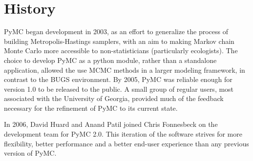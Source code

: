 \hypertarget{history}{}
\section*{History}

PyMC began development in 2003, as an effort to generalize the process of building Metropolis-Hastings samplers, with an aim to making Markov chain Monte Carlo more accessible to non-statisticians (particularly ecologists). The choice to develop PyMC as a python module, rather than a standalone application, allowed the use MCMC methods in a larger modeling framework, in contrast to the BUGS environment. By 2005, PyMC was reliable enough for version 1.0 to be released to the public. A small group of regular users, most associated with the University of Georgia, provided much of the feedback necessary for the refinement of PyMC to its current state.

In 2006, David Huard and Anand Patil joined Chris Fonnesbeck on the development team for PyMC 2.0. This iteration of the software strives for more flexibility, better performance and a better end-user experience than any previous version of PyMC.



